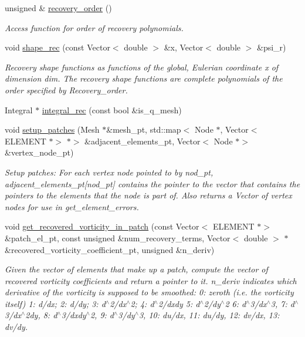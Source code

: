 \begin{DoxyCompactItemize}
unsigned \& \hyperlink{classVorticitySmoother_a05a61dc88d10b4ebd5c932fbea2b026c}{recovery\+\_\+order} ()
\begin{DoxyCompactList}\small\item\em Access function for order of recovery polynomials. \end{DoxyCompactList}\item 
void \hyperlink{classVorticitySmoother_a16d8a464f8285c17dfdf82a081e28783}{shape\+\_\+rec} (const Vector$<$ double $>$ \&x, Vector$<$ double $>$ \&psi\+\_\+r)
\begin{DoxyCompactList}\small\item\em Recovery shape functions as functions of the global, Eulerian coordinate x of dimension dim. The recovery shape functions are complete polynomials of the order specified by Recovery\+\_\+order. \end{DoxyCompactList}\item 
Integral $\ast$ \hyperlink{classVorticitySmoother_a5f27e46e120d81db35505b495a0e88c4}{integral\+\_\+rec} (const bool \&is\+\_\+q\+\_\+mesh)
\item 
void \hyperlink{classVorticitySmoother_ada5ca8e3f98cd2d6eab2cd88af7e66a2}{setup\+\_\+patches} (Mesh $\ast$\&mesh\+\_\+pt, std\+::map$<$ Node $\ast$, Vector$<$ E\+L\+E\+M\+E\+NT $\ast$$>$ $\ast$$>$ \&adjacent\+\_\+elements\+\_\+pt, Vector$<$ Node $\ast$$>$ \&vertex\+\_\+node\+\_\+pt)
\begin{DoxyCompactList}\small\item\em Setup patches\+: For each vertex node pointed to by nod\+\_\+pt, adjacent\+\_\+elements\+\_\+pt\mbox{[}nod\+\_\+pt\mbox{]} contains the pointer to the vector that contains the pointers to the elements that the node is part of. Also returns a Vector of vertex nodes for use in get\+\_\+element\+\_\+errors. \end{DoxyCompactList}\item 
void \hyperlink{classVorticitySmoother_a8addba8cf70bba3d307c699af0e65506}{get\+\_\+recovered\+\_\+vorticity\+\_\+in\+\_\+patch} (const Vector$<$ E\+L\+E\+M\+E\+NT $\ast$$>$ \&patch\+\_\+el\+\_\+pt, const unsigned \&num\+\_\+recovery\+\_\+terms, Vector$<$ double $>$ $\ast$\&recovered\+\_\+vorticity\+\_\+coefficient\+\_\+pt, unsigned \&n\+\_\+deriv)
\begin{DoxyCompactList}\small\item\em Given the vector of elements that make up a patch, compute the vector of recovered vorticity coefficients and return a pointer to it. n\+\_\+deriv indicates which derivative of the vorticity is supposed to be smoothed\+: 0\+: zeroth (i.\+e. the vorticity itself) 1\+: d/dx; 2\+: d/dy; 3\+: d$^\wedge$2/dx$^\wedge$2; 4\+: d$^\wedge$2/dxdy 5\+: d$^\wedge$2/dy$^\wedge$2 6\+: d$^\wedge$3/dx$^\wedge$3, 7\+: d$^\wedge$3/dx$^\wedge$2dy, 8\+: d$^\wedge$3/dxdy$^\wedge$2, 9\+: d$^\wedge$3/dy$^\wedge$3, 10\+: du/dx, 11\+: du/dy, 12\+: dv/dx, 13\+: dv/dy. \end{DoxyCompactList}\item 

\end{DoxyCompactItemize}
